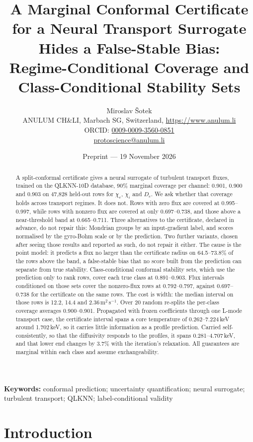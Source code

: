 \documentclass[11pt]{article}
\title{A Marginal Conformal Certificate for a Neural Transport Surrogate\\
Hides a False-Stable Bias:\\
Regime-Conditional Coverage and Class-Conditional Stability Sets}
\author{Miroslav \v{S}otek\\
\small ANULUM CH\&LI, Marbach SG, Switzerland, \url{https://www.anulum.li}\\
\small ORCID: \href{https://orcid.org/0009-0009-3560-0851}{0009-0009-3560-0851}\\
\small \href{mailto:protoscience@anulum.li}{protoscience@anulum.li}}
\date{Preprint --- 19 November 2026}
\begin{document}
\maketitle

\begin{abstract}
A split-conformal certificate gives a neural surrogate of turbulent transport
fluxes, trained on the QLKNN-10D database, 90\% marginal coverage per channel:
0.901, 0.900 and 0.903 on 47,828 held-out rows for $\chi_e$, $\chi_i$ and
$D_e$.  We ask whether that coverage holds across transport regimes.  It does
not.  Rows with zero flux are covered at 0.995--0.997, while rows with nonzero
flux are covered at only 0.697--0.738, and those above a near-threshold band at
0.665--0.711.  Three alternatives to the certificate, declared in advance, do not repair
this: Mondrian groups by an input-gradient label, and scores normalised by the
gyro-Bohm scale or by the prediction.  Two further variants, chosen after
seeing those results and reported as such, do not repair it either.  The
cause is the point model: it predicts a flux no larger than the certificate
radius on 64.5--73.8\% of the rows above the band, a false-stable bias that no
score built from the prediction can separate from true stability.
Class-conditional conformal stability sets, which use the prediction only to
rank rows, cover each true class at 0.891--0.903.  Flux intervals conditioned
on those sets cover the nonzero-flux rows at 0.792--0.797, against
0.697--0.738 for the certificate on the same rows.  The cost is width: the
median interval on those rows is 12.2, 14.4 and 2.36\,m$^2$\,s$^{-1}$.  Over 20
random re-splits the per-class coverage averages 0.900--0.901.  Propagated
with frozen coefficients through one L-mode transport case, the certificate
interval spans a core temperature of 0.262--7.224\,keV around 1.702\,keV, so
it carries little information as a profile prediction.  Carried
self-consistently, so that the diffusivity responds to the profiles, it spans
0.281--4.707\,keV, and that lower end changes by 3.7\% with the iteration's
relaxation.  All guarantees are marginal within each class and assume
exchangeability.
\end{abstract}

\noindent\textbf{Keywords:} conformal prediction; uncertainty quantification;
neural surrogate; turbulent transport; QLKNN; label-conditional validity

\section{Introduction}
\end{document}
